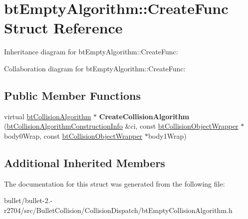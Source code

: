 \hypertarget{structbt_empty_algorithm_1_1_create_func}{\section{bt\+Empty\+Algorithm\+:\+:Create\+Func Struct Reference}
\label{structbt_empty_algorithm_1_1_create_func}
}


Inheritance diagram for bt\+Empty\+Algorithm\+:\+:Create\+Func\+:


Collaboration diagram for bt\+Empty\+Algorithm\+:\+:Create\+Func\+:
\subsection*{Public Member Functions}
\begin{DoxyCompactItemize}
\item 
\hypertarget{structbt_empty_algorithm_1_1_create_func_a51d47b69b6e5811adb4e0dfb932d2d09}{virtual \hyperlink{classbt_collision_algorithm}{bt\+Collision\+Algorithm} $\ast$ {\bfseries Create\+Collision\+Algorithm} (\hyperlink{structbt_collision_algorithm_construction_info}{bt\+Collision\+Algorithm\+Construction\+Info} \&ci, const \hyperlink{structbt_collision_object_wrapper}{bt\+Collision\+Object\+Wrapper} $\ast$body0\+Wrap, const \hyperlink{structbt_collision_object_wrapper}{bt\+Collision\+Object\+Wrapper} $\ast$body1\+Wrap)}\label{structbt_empty_algorithm_1_1_create_func_a51d47b69b6e5811adb4e0dfb932d2d09}

\end{DoxyCompactItemize}
\subsection*{Additional Inherited Members}


The documentation for this struct was generated from the following file\+:\begin{DoxyCompactItemize}
\item 
bullet/bullet-\/2.-\/r2704/src/\+Bullet\+Collision/\+Collision\+Dispatch/bt\+Empty\+Collision\+Algorithm.\+h\end{DoxyCompactItemize}
